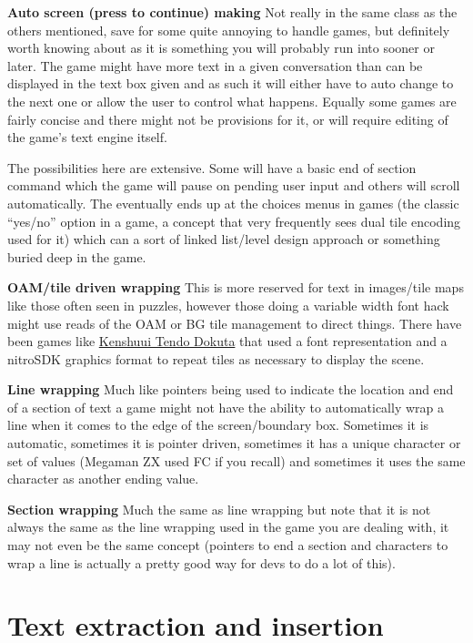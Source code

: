 \documentclass[
]{book}
\begin{document}
\textbf{Auto screen (press to continue) making} Not really in the same class as the others mentioned, save for some quite annoying to handle games, but definitely worth knowing about as it is something you will probably run into sooner or later. The game might have more text in a given conversation than can be displayed in the text box given and as such it will either have to auto change to the next one or allow the user to control what happens. Equally some games are fairly concise and there might not be provisions for it, or will require editing of the game's text engine itself.

The possibilities here are extensive. Some will have a basic end of section command which the game will pause on pending user input and others will scroll automatically. The eventually ends up at the choices menus in games (the classic ``yes/no'' option in a game, a concept that very frequently sees dual tile encoding used for it) which can a sort of linked list/level design approach or something buried deep in the game.

\textbf{OAM/tile driven wrapping} This is more reserved for text in images/tile maps like those often seen in puzzles, however those doing a variable width font hack might use reads of the OAM or BG tile management to direct things. There have been games like \href{http://gbatemp.net/topic/320192-japanese-programming-madness/}{Kenshuui Tendo Dokuta} that used a font representation and a nitroSDK graphics format to repeat tiles as necessary to display the scene.

\textbf{Line wrapping} Much like pointers being used to indicate the location and end of a section of text a game might not have the ability to automatically wrap a line when it comes to the edge of the screen/boundary box. Sometimes it is automatic, sometimes it is pointer driven, sometimes it has a unique character or set of values (Megaman ZX used FC if you recall) and sometimes it uses the same character as another ending value.

\textbf{Section wrapping} Much the same as line wrapping but note that it is not always the same as the line wrapping used in the game you are dealing with, it may not even be the same concept (pointers to end a section and characters to wrap a line is actually a pretty good way for devs to do a lot of this).

\hypertarget{text-extraction-and-insertion}{%
\section{Text extraction and insertion}\label{text-extraction-and-insertion}}
\end{document}
